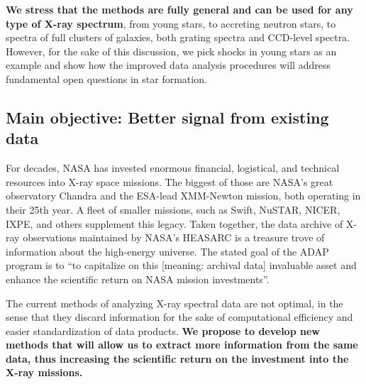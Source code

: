 \documentclass[fleqn,12pt,onecolumn]{SelfArx} %
\begin{document}
\textbf{We stress that the methods are fully general and can be used for any type of X-ray spectrum}, from young stars, to accreting neutron stars, to spectra of full clusters of galaxies, both grating spectra and CCD-level spectra. However, for the sake of this discussion, we pick shocks in young stars as an example and show how the improved data analysis procedures will address fundamental open questions in star formation.

\subsection{Main objective: Better signal from existing data}
For decades, NASA has invested enormous financial, logistical, and technical resources into X-ray space missions. The biggest of those are NASA's great observatory Chandra and the ESA-lead XMM-Newton mission, both operating in their 25th year. A fleet of smaller missions, such as Swift, NuSTAR, NICER, IXPE, and others supplement this legacy. %
Taken together, the data archive of X-ray observations maintained by NASA's HEASARC is a treasure trove of information about the high-energy universe.
The stated goal of the ADAP program is to ``to capitalize on
this [meaning: archival data] invaluable asset and enhance the scientific return on NASA mission investments''.

The current methods of analyzing X-ray spectral data are not optimal, in the sense that they discard information for the sake of computational efficiency and easier standardization of data products. \textbf{We propose to develop new methods that will allow us to extract more information from the same data, thus increasing the scientific return on the investment into the X-ray missions.}

\end{document}

